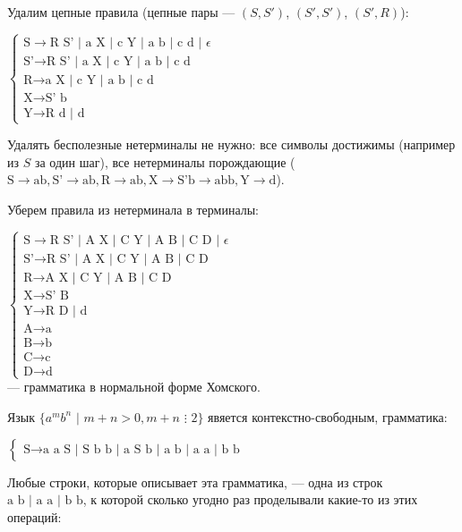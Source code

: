 \documentclass[12pt,a4paper]{scrartcl}
\begin{document}
\begin{description}
	
	Удалим цепные правила (цепные пары --- $(S, S')$, $(S', S')$, $(S', R)$):
	
	$\begin{cases}
	\text{S} \rightarrow \text{R S' | a X | c Y | a b | c d | } \epsilon\\
	\text{S'} \rightarrow \text{R S' | a X | c Y | a b | c d } \\
	\text{R} \rightarrow \text{a X | c Y | a b | c d}\\
	\text{X} \rightarrow \text{S' b}\\
	\text{Y} \rightarrow \text{R d | d}
	\end{cases}$	
	
	Удалять бесполезные нетерминалы не нужно: все символы достижимы (например из $S$ за один шаг), все нетерминалы порождающие ($\text{S} \rightarrow \text{ab}, \text{S'} \rightarrow \text{ab}, \text{R} \rightarrow \text{ab}, \text{X} \rightarrow \text{S'b} \rightarrow \text{abb}, \text{Y} \rightarrow \text{d}$).
	
	Уберем правила из нетерминала в терминалы:
	
	$\begin{cases}
	\text{S} \rightarrow \text{R S' | A X | C Y | A B | C D | } \epsilon\\
	\text{S'} \rightarrow \text{R S' | A X | C Y | A B | C D } \\
	\text{R} \rightarrow \text{A X | C Y | A B | C D}\\
	\text{X} \rightarrow \text{S' B}\\
	\text{Y} \rightarrow \text{R D | d}\\
	\text{A} \rightarrow \text{a}\\
	\text{B} \rightarrow \text{b}\\
	\text{C} \rightarrow \text{c}\\
	\text{D} \rightarrow \text{d}
	\end{cases}$ \\--- грамматика в нормальной форме Хомского.


	\item[\fbox{3.}] Язык $\{ a^m b^n\,\,|\,\,m + n > 0, m + n\,\,\vdots\,\, 2 \}$ явяется контекстно-свободным, грамматика:
	
	$\begin{cases}
		\text{S} \rightarrow \text{a a S | S b b | a S b | a b | a a | b b}
	\end{cases}$
	
	Любые строки, которые описывает эта грамматика, --- одна из строк $\text{a b | a a | b b}$, к которой сколько угодно раз проделывали какие-то из этих операций:
	

\end{description}
\end{document}
